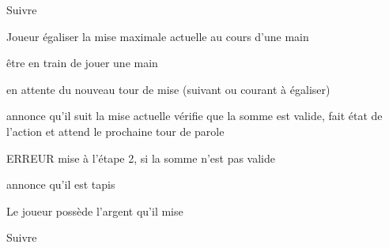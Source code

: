 

\begin{usecase}{Suivre}

	\begin{presentation}
		\actor Joueur
		\goal égaliser la mise maximale actuelle au cours d'une main
		
		\begin{precondition}
			\condition être en train de jouer une main
		\end{precondition}
		
		\begin{postcondition}
			\condition en attente du nouveau tour de mise (suivant ou courant à égaliser)
		\end{postcondition}
		
		\begin{includeuc}
			\aucun
		\end{includeuc}
	\end{presentation}
	
	\begin{scenario}
		\start annonce qu'il suit la mise actuelle
			\system vérifie que la somme est valide, fait état de l'action et attend le prochaine tour de parole
	\end{scenario}
	
	\begin{alternative}
		\nomalt ERREUR mise
			\condition à l'étape 2, si la somme n'est pas valide
			
		\begin{alt}
			\system annonce qu'il est tapis
		\end{alt}
	\end{alternative}
	
	\begin{regles}
		\nom Le joueur possède l'argent qu'il mise
	\end{regles}
	
	                {Suivre}
	
\end{usecase}



